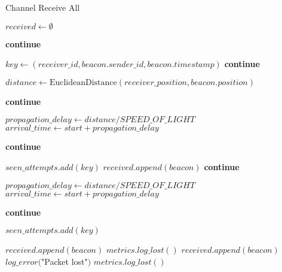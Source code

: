 \documentclass{article}
\begin{document}
\begin{algorithm}
\caption{Channel Receive All}
\begin{algorithmic}[1]
    \State $received \gets \emptyset$
    
            \State \textbf{continue} 
        \EndIf
        
        \State $key \gets (receiver\_id, beacon.sender\_id, beacon.timestamp)$
            \State \textbf{continue} 
        \EndIf
        
        \State $distance \gets \text{EuclideanDistance}(receiver\_position, beacon.position)$
        
                \State \textbf{continue} 
            \EndIf
            
            \State $propagation\_delay \gets distance / SPEED\_OF\_LIGHT$
            \State $arrival\_time \gets start + propagation\_delay$
            
                \State \textbf{continue} 
            \EndIf
            
            \State $seen\_attempts.add(key)$
            \State $received.append(beacon)$
        \Else
                \State \textbf{continue} 
            \EndIf
            
            \State $propagation\_delay \gets distance / SPEED\_OF\_LIGHT$
            \State $arrival\_time \gets start + propagation\_delay$
            
                \State \textbf{continue} 
            \EndIf
            
            \State $seen\_attempts.add(key)$
            
                    \State $received.append(beacon)$
                    \State $metrics.log\_lost()$
                \EndIf
                    \State $received.append(beacon)$
                \Else
                    \State $log\_error($"Packet lost"$)$
                        \State $metrics.log\_lost()$
                    \EndIf
                \EndIf
            \EndIf
        \EndIf
    \EndFor
    

\end{algorithmic}
\end{algorithm}
\end{document}
